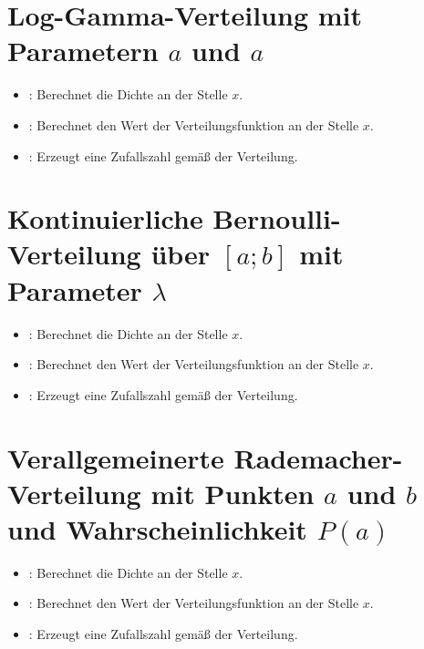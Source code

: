 \section{Log-Gamma-Verteilung mit Parametern \texorpdfstring{$a$}{a} und \texorpdfstring{$a$}{a}}

\begin{itemize}

\item
{}:
Berechnet die Dichte an der Stelle $x$.

\item
{}:
Berechnet den Wert der Verteilungsfunktion an der Stelle $x$.

\item
{}:
Erzeugt eine Zufallszahl gemäß der Verteilung.

\end{itemize}



\section{Kontinuierliche Bernoulli-Verteilung über \texorpdfstring{$[a;b]$}{[a;b]} mit Parameter \texorpdfstring{$\lambda$}{lambda}}

\begin{itemize}

\item
{}:
Berechnet die Dichte an der Stelle $x$.

\item
{}:
Berechnet den Wert der Verteilungsfunktion an der Stelle $x$.

\item
{}:
Erzeugt eine Zufallszahl gemäß der Verteilung.

\end{itemize}



\section{Verallgemeinerte Rademacher-Verteilung mit Punkten \texorpdfstring{$a$}{a} und \texorpdfstring{$b$}{b} und Wahrscheinlichkeit \texorpdfstring{$P(a)$}{P(a)}}

\begin{itemize}

\item
{}:
Berechnet die Dichte an der Stelle $x$.

\item
{}:
Berechnet den Wert der Verteilungsfunktion an der Stelle $x$.

\item
{}:
Erzeugt eine Zufallszahl gemäß der Verteilung.

\end{itemize}



